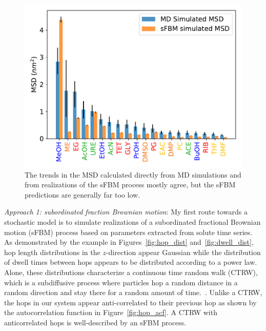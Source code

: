 \documentclass{article}
\begin{document}
  \begin{figure}
  \centering
  \vspace{-0.6cm}
  \includegraphics[width=\linewidth]{all_tamsds.pdf}
  \caption{The trends in the MSD calculated directly from MD simulations and from
  realizations of the sFBM process mostly agree, but the sFBM predictions are generally
  far too low.}\label{fig:sFBM_MSDs}
  \vspace{-0.5cm}
  \end{figure}

  \textit{Approach 1: subordinated fraction Brownian motion}: My first route 
  towards a stochastic model is to simulate realizations of a subordinated 
  fractional Brownian motion (sFBM) process based on parameters extracted 
  from solute time series.~\cite{meroz_subdiffusion_2010} As demonstrated 
  by the example in Figures~\ref{fig:hop_dist} and~\ref{fig:dwell_dist},
  hop length distributions in the $z$-direction appear Gaussian while the 
  distribution of dwell times between hops appears to be distributed 
  according to a power law. Alone, these distributions characterize a 
  continuous time random walk (CTRW), which is a subdiffusive process where
  particles hop a random distance in a random direction and stay there for
  a random amount of time.~\cite{meroz_toolbox_2015}. Unlike a CTRW, the 
  hops in our system appear anti-correlated to their previous hop as shown
  by the autocorrelation function in Figure~\ref{fig:hop_acf}. A CTRW with
  anticorrelated hops is well-described by an sFBM process. 
\end{document}
